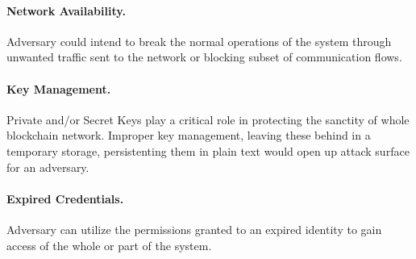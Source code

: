 \paragraph{Network Availability.}  Adversary could intend to break the normal operations of the system through unwanted traffic sent to the network or blocking subset of communication flows.

\paragraph{Key Management.}  Private and/or Secret Keys play a critical role in protecting the sanctity of whole blockchain network. Improper key management, leaving these behind in a temporary storage, persistenting them in plain text would open up attack surface for an adversary.

\paragraph{Expired Credentials.}  Adversary can utilize the permissions granted to an expired identity to gain access of the whole or part of the system.